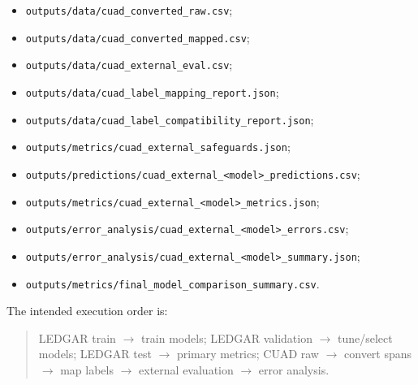 \documentclass[11pt]{article}
\begin{document}
\begin{itemize}[leftmargin=*]
    \item \texttt{outputs/data/cuad\_converted\_raw.csv};
    \item \texttt{outputs/data/cuad\_converted\_mapped.csv};
    \item \texttt{outputs/data/cuad\_external\_eval.csv};
    \item \texttt{outputs/data/cuad\_label\_mapping\_report.json};
    \item \texttt{outputs/data/cuad\_label\_compatibility\_report.json};
    \item \texttt{outputs/metrics/cuad\_external\_safeguards.json};
    \item \texttt{outputs/predictions/cuad\_external\_<model>\_predictions.csv};
    \item \texttt{outputs/metrics/cuad\_external\_<model>\_metrics.json};
    \item \texttt{outputs/error\_analysis/cuad\_external\_<model>\_errors.csv};
    \item \texttt{outputs/error\_analysis/cuad\_external\_<model>\_summary.json};
    \item \texttt{outputs/metrics/final\_model\_comparison\_summary.csv}.
\end{itemize}

The intended execution order is:

\begin{quote}
LEDGAR train $\rightarrow$ train models; LEDGAR validation $\rightarrow$ tune/select models; LEDGAR test $\rightarrow$ primary metrics; CUAD raw $\rightarrow$ convert spans $\rightarrow$ map labels $\rightarrow$ external evaluation $\rightarrow$ error analysis.
\end{quote}
\end{document}
